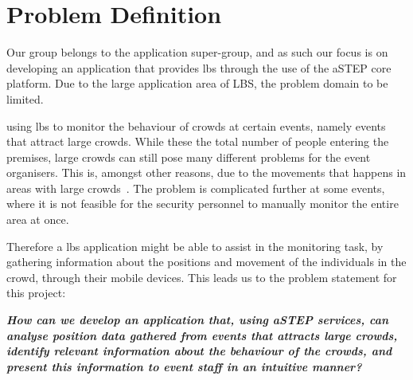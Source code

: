 \section{Problem Definition} \label{sec:problem_def}
Our group belongs to the application super-group, and as such our focus is on developing an application that provides \gls{lbs} through the use of the aSTEP core platform. Due to the large application area of LBS, the problem domain  to be limited. 

 using \gls{lbs} to monitor the behaviour of crowds at certain events, namely events that attract large crowds. While these  the total number of people entering the premises, large crowds can still pose many different problems for the event organisers. This is, amongst other reasons, due to the  movements that happens in areas with large crowds~\cite{wirz2012inferring}. The problem is complicated further at some events, where it is not feasible for the security personnel to manually monitor the entire area at once. 

Therefore a \gls{lbs} application might be able to assist in the monitoring task, by gathering information about the positions and movement of the individuals in the crowd, through their mobile devices. This leads us to the problem statement for this project:

\vspace{0.5 cm}
\begin{center}
	\textbf{\textit{How can we develop an application that, using aSTEP services, can analyse position data gathered from events that attracts large crowds, identify relevant information about the behaviour of the crowds, and present this information to event staff in an intuitive manner?}}
\end{center}